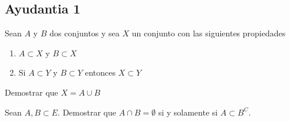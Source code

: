 \documentclass[../main.tex]{subfiles}
\begin{document}
\subsection{Ayudantia 1}

\begin{problem}
  Sean $A$ y $B$ dos conjuntos y sea $X$ un conjunto con las siguientes propiedades
  \begin{enumerate}
    \item $A \subset X$ y $B \subset X$
    \item Si $A \subset Y$ y $B \subset Y$ entonces $X \subset Y$
  \end{enumerate}

  Demostrar que $X = A \cup B$
\end{problem}
%
%

\begin{problem}
Sean $A, B \subset E$. Demostrar que $A \cap B = \emptyset$ si y solamente si $A \subset B^{C}$.
\end{problem}
\end{document}
